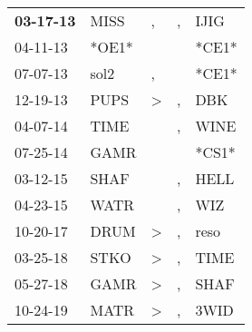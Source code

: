 \begin{supertabular}{p{0.07\textwidth}p{0.06\textwidth}p{0.02\textwidth}p{0.02\textwidth}p{0.06\textwidth}}
 \textbf{03-17-13\textsuperscript{}} &           MISS\textsuperscript{} &                , &                , &           IJIG\textsuperscript{} \\
          04-11-13\textsuperscript{} &                            *OE1* &                  &                  &                            *CE1* \\
          07-07-13\textsuperscript{} &           sol2\textsuperscript{} &                , &                  &                            *CE1* \\
          12-19-13\textsuperscript{} &           PUPS\textsuperscript{} &     \textgreater &                , &            DBK\textsuperscript{} \\
          04-07-14\textsuperscript{} &           TIME\textsuperscript{} &                  &                , &           WINE\textsuperscript{} \\
          07-25-14\textsuperscript{} &           GAMR\textsuperscript{} &                  &                  &                            *CS1* \\
          03-12-15\textsuperscript{} &           SHAF\textsuperscript{} &                  &                , &           HELL\textsuperscript{} \\
          04-23-15\textsuperscript{} &           WATR\textsuperscript{} &                  &                , &            WIZ\textsuperscript{} \\
          10-20-17\textsuperscript{} &           DRUM\textsuperscript{} &     \textgreater &                , &           reso\textsuperscript{} \\
          03-25-18\textsuperscript{} &           STKO\textsuperscript{} &     \textgreater &                , &           TIME\textsuperscript{} \\
          05-27-18\textsuperscript{} &           GAMR\textsuperscript{} &     \textgreater &                , &           SHAF\textsuperscript{} \\
          10-24-19\textsuperscript{} &           MATR\textsuperscript{} &     \textgreater &                , &           3WID\textsuperscript{} \\
\end{supertabular}
